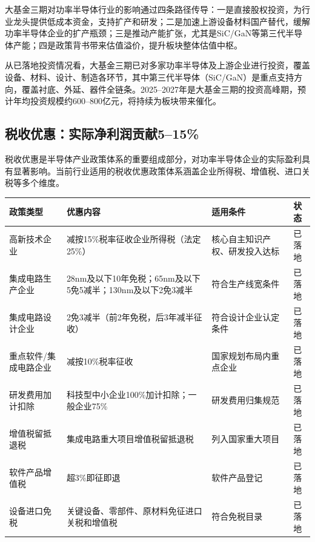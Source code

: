 大基金三期对功率半导体行业的影响通过四条路径传导：一是直接股权投资，为行业龙头提供低成本资金，支持扩产和研发；二是加速上游设备材料国产替代，缓解功率半导体企业的扩产瓶颈；三是推动产能扩张，尤其是SiC/GaN等第三代半导体产能；四是政策背书带来估值溢价，提升板块整体估值中枢。

从已落地投资情况看，大基金三期已对多家功率半导体及上游企业进行投资，覆盖设备、材料、设计、制造各环节，其中第三代半导体（SiC/GaN）是重点支持方向，覆盖衬底、外延、器件全链条。2025--2027年是大基金三期的投资高峰期，预计年均投资规模约600--800亿元，将持续为板块带来催化。

\subsection{税收优惠：实际净利润贡献5--15\%}

税收优惠是半导体产业政策体系的重要组成部分，对功率半导体企业的实际盈利具有显著影响。当前行业适用的税收优惠政策体系涵盖企业所得税、增值税、进口关税等多个维度。

\begin{exhibitbox}[表 8-2：主要税收优惠政策及对功率半导体企业影响]
\centering
\small
\begin{tabularx}{\textwidth}{X L{4.5cm} L{2.5cm} c}
\toprule
\textbf{政策类型} & \textbf{优惠内容} & \textbf{适用条件} & \textbf{状态} \\
\midrule
高新技术企业 & 减按15\%税率征收企业所得税（法定25\%） & 核心自主知识产权、研发投入达标 & 已落地 \\
集成电路生产企业 & 28nm及以下10年免税；65nm及以下5免5减半；130nm及以下2免3减半 & 符合生产线宽条件 & 已落地 \\
集成电路设计企业 & 2免3减半（前2年免税，后3年减半征收） & 符合设计企业认定条件 & 已落地 \\
重点软件/集成电路企业 & 减按10\%税率征收 & 国家规划布局内重点企业 & 已落地 \\
研发费用加计扣除 & 科技型中小企业100\%加计扣除；一般企业75\% & 研发费用归集规范 & 已落地 \\
\midrule
增值税留抵退税 & 集成电路重大项目增值税留抵退税 & 列入国家重大项目 & 已落地 \\
软件产品增值税 & 超3\%即征即退 & 软件产品登记 & 已落地 \\
设备进口免税 & 关键设备、零部件、原材料免征进口关税和增值税 & 符合免税目录 & 已落地 \\
\bottomrule
\end{tabularx}
\end{exhibitbox}

